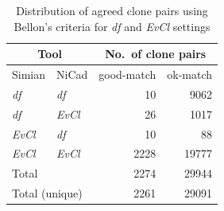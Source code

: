 \documentclass{sig-alternate-05-2015}
\begin{document}
\begin{table}[H]
	\centering
	\caption{Distribution of agreed clone pairs using Bellon's criteria for \textit{df} and \textit{EvCl} settings}
	\label{t_agreed_good_clone_pairs}
	\small
	\begin{tabular}{l|l|r|r}
		\hline
		\multicolumn{2}{c|}{Tool} & \multicolumn{2}{c}{No.~of clone pairs} \\
		\hline
		Simian & NiCad & good-match & ok-match \\
		\hline
		\textit{df} & \textit{df} & 10 	& 9062 \\ 
		\textit{df} & \textit{EvCl} 	& 26 	& 1017 \\ 
		\textit{EvCl} 	& \textit{df} 	& 10 	& 88 \\
		\textit{EvCl} 	& \textit{EvCl} 	& 2228 & 19777 \\ 
		\hline
		\multicolumn{2}{l|}{Total} & 2274 & 29944 \\
		\hline
		\multicolumn{2}{l|}{Total (unique)} & 2261 &  29091 \\
		\hline
	\end{tabular}
\end{table}
\end{document}
